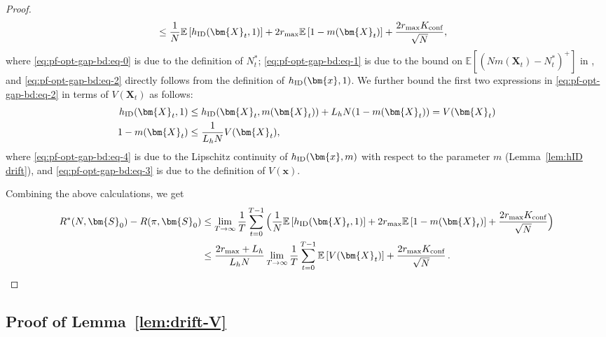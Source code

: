 \documentclass{article}
\theoremstyle{plain}
\theoremstyle{remark}
\newcommand{\mx}{\bm{x}}
\newcommand{\hid}{h_{\textnormal{ID}}}
\newcommand{\ID}{\textnormal{ID}}
\newcommand{\conf}{\text{conf}}
\def\mX{{\bm{X}}}
\newcommand{\EE}{\mathbb{E}}
\newcommand{\bracket}[1]{\left(#1\right)}
\newcommand{\mbracket}[1]{\left[#1\right]}
\begin{document}
\begin{proof}
\begin{align}
        \label{eq:pf-opt-gap-bd:eq-2}
        &\leq \frac{1}{N}\EE\mbracket{h_{\ID}(\mX_{t},1)} + 2r_{\max} \EE\mbracket{1-m(\mX_{t})} + \frac{2r_{\max} K_{\conf}}{\sqrt{N}},
    \end{align}
    where \eqref{eq:pf-opt-gap-bd:eq-0} is due to the definition of $N_t^*$; \eqref{eq:pf-opt-gap-bd:eq-1} is due to the bound on $\EE[\bracket{Nm(\mX_t) - N_t^* }^+]$ in , and \eqref{eq:pf-opt-gap-bd:eq-2} directly follows from the definition of $\hid(\mx, 1)$. 
    We further bound the first two expressions in \eqref{eq:pf-opt-gap-bd:eq-2} in terms of $V(\mX_t)$ as follows: 
    \begin{align}
        \label{eq:pf-opt-gap-bd:eq-4}
        h_{\ID}(\mX_{t},1)&\leq h_{\ID}(\mX_{t},m(\mX_{t}))+L_h N (1-m(\mX_{t}))=V(\mX_{t}) \\
        \label{eq:pf-opt-gap-bd:eq-3}
        1-m(\mX_{t}) &\leq \frac{1}{L_h N}V(\mX_{t}),
    \end{align}
    where \eqref{eq:pf-opt-gap-bd:eq-4} is due to the Lipschitz continuity of $\hid(\mx, m)$ with respect to the parameter $m$ (Lemma~\ref{lem:hID drift}), and \eqref{eq:pf-opt-gap-bd:eq-3} is due to the definition of $V(\mx)$.  

    Combining the above calculations, we get
    \begin{align*}
       R^*(N,\bm{S}_0) - R(\pi,\bm{S}_0)
       &\leq  \lim_{T\to\infty} \frac{1}{T} \sum_{t=0}^{T-1} \Big(\frac{1}{N}\EE\mbracket{h_{\ID}(\mX_{t},1)} + 2r_{\max} \EE\mbracket{1-m(\mX_{t})} + \frac{2 r_{\max} K_{\conf}}{\sqrt{N}}   \Big) \\
       &\leq \frac{2r_{\max} + L_h}{L_h N}\lim_{T\to\infty}\frac{1}{T}\sum_{t=0}^{T-1}\EE\mbracket{V(\mX_{t})} + \frac{2 r_{\max} K_{\conf}}{\sqrt{N}}\,. \qedhere
    \end{align*}
\end{proof}

\subsection{Proof of Lemma~\ref{lem:drift-V}}
\label{app:pf-lem:drift-V}

\driftV*
\end{document}

